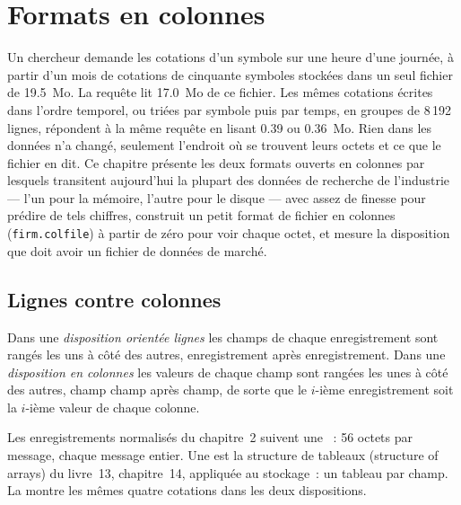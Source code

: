 \chapter{Formats en colonnes}\label{ch:pl:columnar-formats}

Un chercheur demande les cotations d'un symbole sur une heure d'une journée, à partir d'un mois de cotations de cinquante symboles stockées dans un seul
fichier de 19.5~Mo. La requête lit 17.0~Mo de ce fichier. Les mêmes cotations écrites dans l'ordre temporel, ou triées par symbole puis par temps, en
groupes de 8\,192 lignes, répondent à la même requête en lisant 0.39 ou 0.36~Mo. Rien dans les données n'a changé, seulement l'endroit où se trouvent leurs
octets et ce que le fichier en dit. Ce chapitre présente les deux formats ouverts en colonnes par lesquels transitent
aujourd'hui la plupart des données de recherche de l'industrie --- l'un pour la mémoire, l'autre pour le disque --- avec assez de finesse pour prédire de tels chiffres, construit
un petit format de fichier en colonnes (\texttt{firm.colfile}) à partir de zéro pour voir chaque octet, et mesure la disposition que doit avoir un
fichier de données de marché.

\section{Lignes contre colonnes}

\begin{definition}\label{def:pl:columnar-formats:layouts}
Dans une \emph{disposition orientée lignes} les champs de chaque enregistrement sont rangés les uns à côté des autres, enregistrement
après enregistrement. Dans une \emph{disposition en colonnes} les valeurs de chaque champ sont rangées les unes à côté des autres, champ
champ après champ, de sorte que le $i$-ième enregistrement soit la $i$-ième valeur de chaque colonne.
\end{definition}

Les enregistrements normalisés du chapitre~2 suivent une ~: 56 octets par message, chaque message entier. Une  est la
structure de tableaux (structure of arrays) du livre~13, chapitre~14, appliquée au stockage~: un tableau par champ.
La  montre les mêmes quatre cotations dans les deux dispositions.

